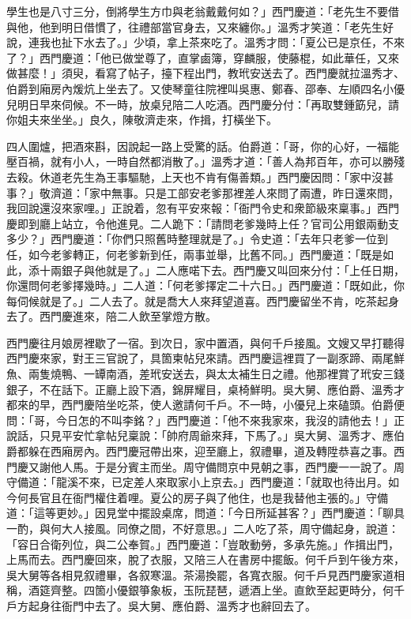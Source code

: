 學生也是八寸三分，倒將學生方巾與老翁戴戴何如？」西門慶道：「老先生不要借與他，他到明日借慣了，往禮部當官身去，又來纏你。」溫秀才笑道：「老先生好說，連我也扯下水去了。」少頃，拿上茶來吃了。溫秀才問：「夏公已是京任，不來了？」{}西門慶道：「他已做堂尊了，直掌鹵簿，穿麟服，使藤棍，如此華任，又來做甚麼！」須臾，看寫了帖子，擡下程出門，教玳安送去了。西門慶就拉溫秀才、伯爵到廂房內煖炕上坐去了。又使琴童往院裡叫吳惠、鄭春、邵奉、左順四名小優兒明日早來伺候。不一時，放桌兒陪二人吃酒。西門慶分付：「再取雙鍾筯兒，請你姐夫來坐坐。」良久，陳敬濟走來，作揖，打橫坐下。

四人圍爐，把酒來斟，因說起一路上受驚的話。伯爵道：「哥，你的心好，一福能壓百禍，就有小人，一時自然都消散了。」溫秀才道：「善人為邦百年，亦可以勝殘去殺。休道老先生為王事驅馳，上天也不肯有傷善類。」{}西門慶因問：「家中沒甚事？」敬濟道：「家中無事。只是工部安老爹那裡差人來問了兩遭，昨日還來問，我回說還沒來家哩。」正說着，忽有平安來報：「衙門令史和衆節級來稟事。」西門慶即到廳上站立，令他進見。二人跪下：「請問老爹幾時上任？官司公用銀兩動支多少？」西門慶道：「你們只照舊時整理就是了。」令史道：「去年只老爹一位到任，如今老爹轉正，何老爹新到任，兩事並舉，比舊不同。」西門慶道：「既是如此，添十兩銀子與他就是了。」二人應喏下去。西門慶又叫回來分付：「上任日期，你還問何老爹擇幾時。」二人道：「何老爹擇定二十六日。」西門慶道：「既如此，你每伺候就是了。」二人去了。就是喬大人來拜望道喜。西門慶留坐不肯，吃茶起身去了。西門慶進來，陪二人飲至掌燈方散。

西門慶往月娘房裡歇了一宿。到次日，家中置酒，與何千戶接風。文嫂又早打聽得西門慶來家，對王三官說了，具箇柬帖兒來請。西門慶這裡買了一副豕蹄、兩尾鮮魚、兩隻燒鴨、一罈南酒，差玳安送去，與太太補生日之禮。他那裡賞了玳安三錢銀子，不在話下。正廳上設下酒，錦屏耀目，桌椅鮮明。吳大舅、應伯爵、溫秀才都來的早，西門慶陪坐吃茶，使人邀請何千戶。不一時，小優兒上來磕頭。伯爵便問：「哥，今日怎的不叫李銘？」西門慶道：「他不來我家來，我沒的請他去！」{}正說話，只見平安忙拿帖兒稟說：「帥府周爺來拜，下馬了。」吳大舅、溫秀才、應伯爵都躲在西廂房內。西門慶冠帶出來，迎至廳上，叙禮畢，道及轉陞恭喜之事。西門慶又謝他人馬。于是分賓主而坐。周守備問京中見朝之事，西門慶一一說了。周守備道：「龍溪不來，已定差人來取家小上京去。」西門慶道：「就取也待出月。如今何長官且在衙門權住着哩。夏公的房子與了他住，也是我替他主張的。」守備道：「這等更妙。」因見堂中擺設桌席，問道：「今日所延甚客？」西門慶道：「聊具一酌，與何大人接風。同僚之間，不好意思。」二人吃了茶，周守備起身，說道：「容日合衛列位，與二公奉賀。」西門慶道：「豈敢動勞，多承先施。」作揖出門，上馬而去。西門慶回來，脫了衣服，又陪三人在書房中擺飯。何千戶到午後方來，吳大舅等各相見叙禮畢，各叙寒溫。茶湯換罷，各寬衣服。何千戶見西門慶家道相稱，酒筵齊整。四箇小優銀箏象板，玉阮琵琶，遞酒上坐。直飲至起更時分，何千戶方起身往衙門中去了。吳大舅、應伯爵、溫秀才也辭回去了。


